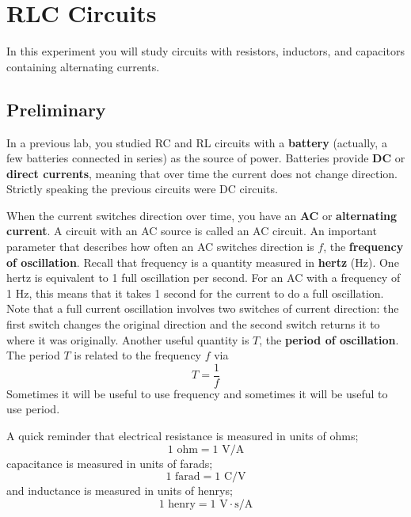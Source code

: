 \setcounter{chapter}{5}
\chapter{RLC Circuits}
In this experiment you will study circuits with resistors, inductors, and capacitors containing alternating currents.
\section{Preliminary}
In a previous lab, you studied RC and RL circuits with a \textbf{battery} (actually, a few batteries connected in series) as the source of power. Batteries provide \textbf{DC} or \textbf{direct currents}, meaning that over time the current does not change direction. Strictly speaking the previous circuits were DC circuits.

When the current switches direction over time, you have an \textbf{AC} or \textbf{alternating current}. A circuit with an AC source is called an AC circuit. An important parameter that describes how often an AC switches direction is $f$, the \textbf{frequency of oscillation}. Recall that frequency is a quantity measured in \textbf{hertz} (Hz). One hertz is equivalent to 1 full oscillation per second. For an AC with a frequency of 1 Hz, this means that it takes 1 second for the current to do a full oscillation. Note that a full current oscillation involves two switches of current direction: the first switch changes the original direction and the second switch returns it to where it was originally. Another useful quantity is $T$, the \textbf{period of oscillation}. The period $T$ is related to the frequency $f$ via
\begin{equation} \label{eq.06.period}
	T = \frac{1}{f}
\end{equation}
Sometimes it will be useful to use frequency and sometimes it will be useful to use period.

A quick reminder that electrical resistance is measured in units of ohms;
\begin{equation}
	1 \text{ ohm} = 1 \text{ V/A}
\end{equation}
capacitance is measured in units of farads;
\begin{equation}
	1 \text{ farad} = 1 \text{ C/V}
\end{equation}
and inductance is measured in units of henrys;
\begin{equation}
	1 \text{ henry} = 1 \text{ V}\cdot\text{s/A}
\end{equation}
